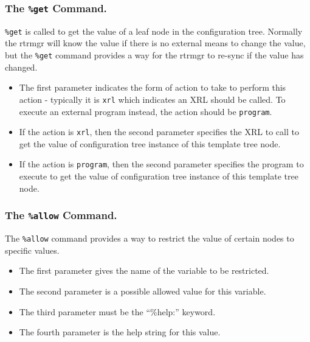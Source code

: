 \documentclass[11pt]{article}
\begin{document}
\subsubsection{The {\tt \%get} Command.}

{\tt \%get} is called to get the value of a leaf node in the
configuration tree.  Normally the rtrmgr will know the value if there
is no external means to change the value, but the {\tt \%get} command
provides a way for the rtrmgr to re-sync if the value has changed.

\begin{itemize}
  \item The first parameter indicates the form of action to take to perform
  this action - typically it is {\tt xrl} which indicates an XRL should
  be called.
  To execute an external program instead, the action should be {\tt program}.

  \item If the action is {\tt xrl}, then the second parameter specifies the
  XRL to call to get the value of configuration tree instance of this template
  tree node.

  \item If the action is {\tt program}, then the second parameter specifies the
  program to execute to get the value of configuration tree instance of this
  template tree node.

\end{itemize}

\subsubsection{The {\tt \%allow} Command.}

The {\tt \%allow} command provides a way to restrict the value of
certain nodes to specific values.

\begin{itemize}

  \item The first parameter gives the name of the variable to be restricted.

  \item The second parameter is a possible allowed value for this variable.

  \item The third parameter must be the ``\%help:'' keyword.

  \item The fourth parameter is the help string for this value.

\end{itemize}
\end{document}
